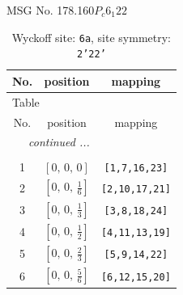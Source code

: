 \documentclass[fleqn,8pt]{jsarticle}
\begin{document}
\setcounter{MaxMatrixCols}{32}

\renewcommand{\tablename}{Table~}
\renewcommand{\figurename}{Figure~}
\begin{center}
\LARGE
MSG No. 178.160\quad$P_{c}6_{1}22$
\end{center}
\renewcommand{\arraystretch}{1.2}
\begin{longtable}{ccc}
\caption{Wyckoff site: {\tt 6a}, site symmetry: {\tt 2'22'}}
 \\
 \hline \hline
No. & position & mapping \\ \hline \endfirsthead

\multicolumn{2}{l}{\tablename\ \thetable{}} \\
 \hline \hline
No. & position & mapping \\ \hline \endhead

 \hline \hline
\multicolumn{2}{r}{\footnotesize\it continued ...} \\ \endfoot

 \hline \hline
\multicolumn{2}{r}{} \\ \endlastfoot

1 & $\left[ 0,\, 0,\, 0 \right]$ & {\tt [1,7,16,23]} \\ \hline
2 & $\left[ 0,\, 0,\, \frac{1}{6} \right]$ & {\tt [2,10,17,21]} \\ \hline
3 & $\left[ 0,\, 0,\, \frac{1}{3} \right]$ & {\tt [3,8,18,24]} \\ \hline
4 & $\left[ 0,\, 0,\, \frac{1}{2} \right]$ & {\tt [4,11,13,19]} \\ \hline
5 & $\left[ 0,\, 0,\, \frac{2}{3} \right]$ & {\tt [5,9,14,22]} \\ \hline
6 & $\left[ 0,\, 0,\, \frac{5}{6} \right]$ & {\tt [6,12,15,20]} \\
\end{longtable}
\renewcommand{\arraystretch}{1.2}
\end{document}
